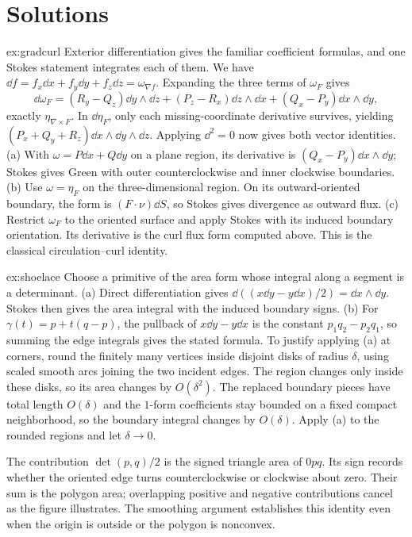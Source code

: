 \section{Solutions}

\begin{solution}{ex:gradcurl}
\idea Exterior differentiation gives the familiar coefficient formulas, and one Stokes statement integrates each of them.
\writeup We have $\dd f=f_x\dd x+f_y\dd y+f_z\dd z=\omega_{\nabla f}$. Expanding the three terms of $\omega_F$ gives
\[
\dd\omega_F=(R_y-Q_z)\dd y\wedge\dd z
+(P_z-R_x)\dd z\wedge\dd x+(Q_x-P_y)\dd x\wedge\dd y,
\]
exactly $\eta_{\nabla\times F}$. In $\dd\eta_F$, only each missing-coordinate derivative survives, yielding $(P_x+Q_y+R_z)\dd x\wedge\dd y\wedge\dd z$. Applying $\dd^2=0$ now gives both vector identities.
(a) With $\omega=P\dd x+Q\dd y$ on a plane region, its derivative is $(Q_x-P_y)\dd x\wedge\dd y$; Stokes gives Green with outer counterclockwise and inner clockwise boundaries.
(b) Use $\omega=\eta_F$ on the three-dimensional region. On its outward-oriented boundary, the form is $(F\cdot\nu)\dd S$, so Stokes gives divergence as outward flux.
(c) Restrict $\omega_F$ to the oriented surface and apply Stokes with its induced boundary orientation. Its derivative is the curl flux form computed above. This is the classical circulation--curl identity.
\end{solution}

\begin{solution}{ex:shoelace}
\idea Choose a primitive of the area form whose integral along a segment is a determinant.
\writeup (a) Direct differentiation gives $\dd((x\dd y-y\dd x)/2)=\dd x\wedge\dd y$. Stokes then gives the area integral with the induced boundary signs.
(b) For $\gamma(t)=p+t(q-p)$, the pullback of $x\dd y-y\dd x$ is the constant $p_1q_2-p_2q_1$, so summing the edge integrals gives the stated formula. To justify applying (a) at corners, round the finitely many vertices inside disjoint disks of radius $\delta$, using scaled smooth arcs joining the two incident edges. The region changes only inside these disks, so its area changes by $O(\delta^2)$. The replaced boundary pieces have total length $O(\delta)$ and the $1$-form coefficients stay bounded on a fixed compact neighborhood, so the boundary integral changes by $O(\delta)$. Apply (a) to the rounded regions and let $\delta\to0$.

The contribution $\det(p,q)/2$ is the signed triangle area of $0pq$. Its sign records whether the oriented edge turns counterclockwise or clockwise about zero. Their sum is the polygon area; overlapping positive and negative contributions cancel as the figure illustrates. The smoothing argument establishes this identity even when the origin is outside or the polygon is nonconvex.
\end{solution}

